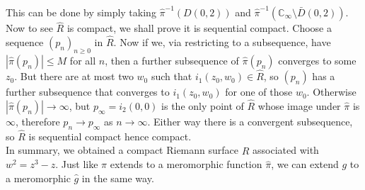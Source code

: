 This can be done by simply taking $\hat\pi^{-1}(D(0,2))$ and $\hat\pi^{-1}(\mathbb C_\infty\setminus\bar{D}(0,2))$.\\
Now to see $\hat{R}$ is compact, we shall prove it is sequential compact.
Choose a sequence $(p_n)_{n\ge 0}$ in $\hat{R}$.
Now if we, via restricting to a subsequence, have $|\hat\pi(p_n)|\le M$ for all $n$, then a further subsequence of $\hat\pi(p_n)$ converges to some $z_0$.
But there are at most two $w_0$ such that $i_1(z_0,w_0)\in\hat{R}$, so $(p_n)$ has a further subsequence that converges to $i_1(z_0,w_0)$ for one of those $w_0$.
Otherwise $|\hat\pi(p_n)|\to\infty$, but $p_\infty=i_2(0,0)$ is the only point of $\hat{R}$ whose image under $\hat\pi$ is $\infty$, therefore $p_n\to p_\infty$ as $n\to\infty$.
Either way there is a convergent subsequence, so $\hat{R}$ is sequential compact hence compact.\\
In summary, we obtained a compact Riemann surface $\hat{R}$ associated with $w^2=z^3-z$.
Just like $\pi$ extends to a meromorphic function $\hat\pi$, we can extend $g$ to a meromorphic $\hat{g}$ in the same way.